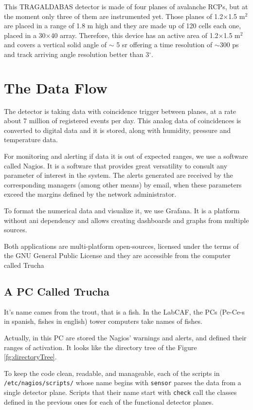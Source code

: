 \documentclass[a4paper]{book}
\begin{document}
This TRAGALDABAS detector is made of four planes of avalanche RCPs, but at the moment only three of them are instrumented yet. Those planes of 1.2$\times$1.5 m$^2$ are placed in a range of 1.8 m high and they are made up of 120 cells each one, placed in a 30$\times$40 array. Therefore, this device has an active area of 1.2$\times$1.5 m$^2$ and covers a vertical solid angle of $\sim $ 5 sr offering a time resolution of $\sim 300$ ps and track arriving angle resolution better than 3$^\circ$. 

\section{The Data Flow}

The detector is taking data with coincidence trigger between planes, at a rate about 7 million of registered events per day. This analog data of coincidences is converted to digital data and it is stored, along with humidity, pressure and temperature data.

For monitoring and alerting if data it is out of expected ranges, we use a software called Nagios. It is a software that provides great versatility to consult any parameter of interest in the system. The alerts generated are received by the corresponding managers (among other means) by email, when these parameters exceed the margins defined by the network administrator.

To format the numerical data and visualize it, we use Grafana. It is a platform without ani dependency and allows creating dashboards and graphs from multiple sources.

Both applications are multi-platform open-sources, licensed under the terms of the GNU General Public License and they are accessible from the computer called Trucha

\subsection{A PC Called Trucha}

It's name cames from the trout, that is a fish. In the LabCAF, the PCs (Pe-Ce-s in spanish, fishes in english) tower computers take names of fishes.

Actually, in this PC are stored the Nagios' warnings and alerts, and defined their ranges of activation. It looks like the directory tree of the Figure \ref{fg:directoryTree}.

To keep the code clean, readable, and manageable, each of the scripts in \texttt{/etc/nagios/scripts/} whose name begins with \texttt{sensor} parses the data from a single detector plane. Scripts that their name start with \texttt{check} call the classes defined in the previous ones for each of the functional detector planes.
\end{document}

